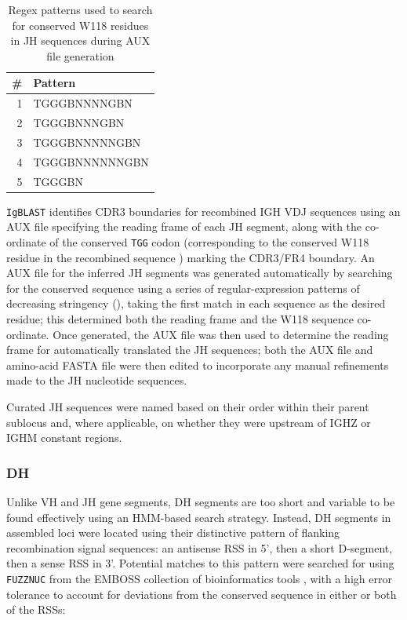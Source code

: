 \begin{table}
\caption{Regex patterns used to search for conserved W118 residues in JH sequences during AUX file generation}\label{tab:jh-aux-patterns}
\begin{tabular}{r>{\ttseries}l}\toprule  
\# & Pattern \\\midrule
1 & TGGGBNNNNGBN\\
2 & TGGGBNNNGBN\\
3 & TGGGBNNNNNGBN\\
4 & TGGGBNNNNNNGBN\\
5 & TGGGBN\\\bottomrule
\end{tabular}
\end{table}

\lstinline{IgBLAST} \citep{ye2013igblast} identifies CDR3 boundaries for recombined IGH VDJ sequences using an AUX file specifying the reading frame of each JH segment, along with the co-ordinate of the conserved \texttt{TGG} codon (corresponding to the conserved W118 residue in the recombined sequence \citep{lefranc2014immunoglobulins}) marking the CDR3/FR4 boundary. An AUX file for the inferred JH segments was generated automatically by searching for the conserved sequence using a series of regular-expression patterns of decreasing stringency (), taking the first match in each sequence as the desired residue; this determined both the reading frame and the W118 sequence co-ordinate. Once generated, the AUX file was then used to determine the reading frame for automatically translated the JH sequences; both the AUX file and amino-acid FASTA file were then edited to incorporate any manual refinements made to the JH nucleotide sequences.

Curated JH sequences were named based on their order within their parent sublocus and, where applicable, on whether they were upstream of IGHZ or IGHM constant regions. 

\subsubsection{DH}

Unlike VH and JH gene segments, DH segments are too short and variable to be found effectively using an HMM-based search strategy. Instead, DH segments in assembled loci were located using their distinctive pattern of flanking recombination signal sequences: an antisense RSS in 5', then a short D-segment, then a sense RSS in 3'. Potential matches to this pattern were searched for using \lstinline{FUZZNUC} from the EMBOSS collection of bioinformatics tools \citep{rice2000emboss}, with a high error tolerance to account for deviations from the conserved sequence in either or both of the RSSs:

